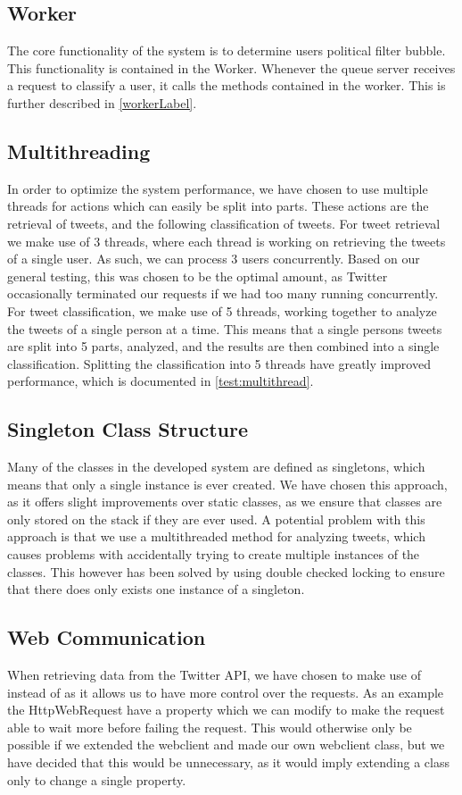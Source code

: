 \subsection{Worker}
The core functionality of the system is to determine users political filter
bubble. This functionality is contained in the Worker. Whenever the queue server
receives a request to classify a user, it calls the methods contained in the
worker. This is further described in \autoref{workerLabel}.

\subsection{Multithreading}\label{subs:multithread}
In order to optimize the system performance, we have chosen to use multiple
threads for actions which can easily be split into parts. These actions are the
retrieval of tweets, and the following classification of tweets. For tweet
retrieval we make use of 3 threads, where each thread is working on retrieving
the tweets of a single user. As such, we can process 3 users concurrently. Based
on our general testing, this was chosen to be the optimal amount, as Twitter
occasionally terminated our requests if we had too many running concurrently.\\
For tweet classification, we make use of 5 threads, working together to analyze
the tweets of a single person at a time. This means that a single persons tweets
are split into 5 parts, analyzed, and the results are then combined into a
single classification. Splitting the classification into 5 threads have greatly
improved performance, which is documented in \autoref{test:multithread}.

\subsection{Singleton Class Structure}
Many of the classes in the developed system are defined as singletons, which
means that only a single instance is ever created. We have chosen this approach,
as it offers slight improvements over static classes, as we ensure that classes
are only stored on the stack if they are ever used. A potential problem with
this approach is that we use a multithreaded method for analyzing tweets, which
causes problems with accidentally trying to create multiple instances of the
classes. This however has been solved by using double checked locking to ensure
that there does only exists one instance of a singleton.

\subsection{Web Communication}
When retrieving data from the Twitter API, we have chosen to make use of
 instead of  as it allows us to have
more control over the requests. As an example the HttpWebRequest have a
 property which we can modify to make the request able to wait
more before failing the request. This would otherwise only be possible if we
extended the webclient and made our own webclient class, but we have decided
that this would be unnecessary, as it would imply extending a class only to
change a single property.

